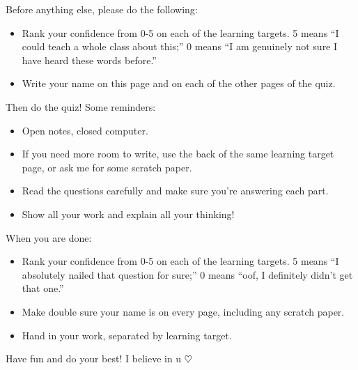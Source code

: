 Before anything else, please do the following:
\begin{itemize}
    \item Rank your confidence from 0-5 on each of the learning targets. 5 means ``I could teach a whole class about this;'' 0 means ``I am genuinely not sure I have heard these words before.''
    \item Write your name on this page and on each of the other pages of the quiz.
\end{itemize}

Then do the quiz! Some reminders:
\begin{itemize}
    \item Open notes, closed computer.
    \item If you need more room to write, use the back of the same learning target page, or ask me for some scratch paper.
    \item Read the questions carefully and make sure you're answering each part.
    \item Show all your work and explain all your thinking!
\end{itemize}

When you are done:
\begin{itemize}
    \item Rank your confidence from 0-5 on each of the learning targets. 5 means ``I absolutely nailed that question for sure;'' 0 means ``oof, I definitely didn't get that one.''
    \item Make double sure your name is on every page, including any scratch paper.
    \item Hand in your work, separated by learning target.
\end{itemize}

Have fun and do your best! I believe in u $\heartsuit$


\pagebreak


